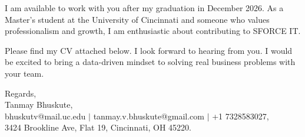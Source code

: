 \documentclass[11pt]{letter}
\begin{document}
\begin{letter}{}
I am available to work with you after my graduation in December 2026. As a Master's student at the University of Cincinnati and someone who values professionalism and growth, I am enthusiastic about contributing to SFORCE IT.

Please find my CV attached below. I look forward to hearing from you. I would be excited to bring a data-driven mindset to solving real business problems with your team.

{\setlength{\parskip}{0pt}
Regards,\\
Tanmay Bhuskute,\\
bhuskutv@mail.uc.edu $\mid$ tanmay.v.bhuskute@gmail.com $\mid$ +1 7328583027,\\
3424 Brookline Ave, Flat 19, Cincinnati, OH 45220.
}

\end{letter}
\end{document}
